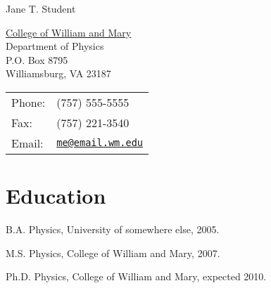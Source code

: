 \documentclass[letterpaper,10pt]{article}
\def\name{Jane T. Student}
\renewenvironment{itemize}{
  \begin{list}{}{
    \setlength{\leftmargin}{1.5em}
  }
}{
  \end{list}
}
\begin{document}
{\huge \name}


\vspace{0.25in}

\begin{minipage}{0.45\linewidth}
  \href{http://www.wayne.edu/}{College of William and Mary} \\
  Department of Physics \\
  P.O. Box 8795 \\
  Williamsburg, VA 23187
\end{minipage}
\begin{minipage}{0.45\linewidth}
  \begin{tabular}{ll}
    Phone: & (757) 555-5555 \\
    Fax: &  (757) 221-3540 \\
    Email: & \href{mailto:me@email.wm.edu}{\tt me@email.wm.edu} \\
  \end{tabular}
\end{minipage}

\section*{Education}

\begin{itemize}
  \item B.A. Physics, University of somewhere else, 2005.

  \item M.S. Physics, College of William and Mary, 2007.

  \item Ph.D. Physics, College of William and Mary, expected 2010.
\end{itemize}

\end{document}
